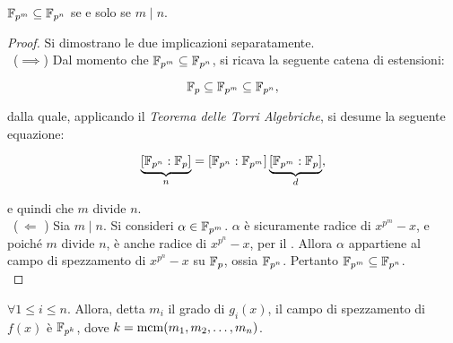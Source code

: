 \begin{theorem}
    \label{th:inclusione}
    $\mathbb{F}_{p^m} \subseteq \mathbb{F}_{p^n}$ se e solo se $m \mid n$.
\end{theorem}

\begin{proof}
    Si dimostrano le due implicazioni separatamente. \\

    \ ($\implies$)\; Dal momento che $\mathbb{F}_{p^m} \subseteq \mathbb{F}_{p^n}$,
        si ricava la seguente catena di estensioni:
        
        \[ \mathbb{F}_p \subseteq \mathbb{F}_{p^m} \subseteq \mathbb{F}_{p^n}, \]
        
        \vskip 0.1in
        
        dalla quale, applicando il \textit{Teorema delle Torri Algebriche},
        si desume la seguente equazione:
        
        \[ \underbrace{[\mathbb{F}_{p^n} : \mathbb{F}_p]}_n = [\mathbb{F}_{p^n} : \mathbb{F}_{p^m}] \underbrace{[\mathbb{F}_{p^m} : \mathbb{F}_p]}_d, \]
        
        e quindi che $m$ divide $n$. \\
        
    \ ($\,\Longleftarrow\,\,$)\; Sia $m \mid n$. Si consideri $\alpha \in \mathbb{F}_{p^m}$. $\alpha$
        è sicuramente radice di $x^{p^m}-x$, e poiché $m$ divide $n$, è
        anche radice di $x^{p^n}-x$, per il . Allora
        $\alpha$ appartiene al campo di spezzamento di $x^{p^n}-x$ su $\mathbb{F}_p$,
        ossia $\mathbb{F}_{p^n}$. Pertanto $\mathbb{F}_{p^m} \subseteq \mathbb{F}_{p^n}$. \\
\end{proof}

\begin{corollary}
    $\forall 1 \leq i \leq n$. Allora, detta $m_i$ il grado di $g_i(x)$, il
    campo di spezzamento di $f(x)$ è $\mathbb{F}_{p^{k}}$, dove $k = \operatorname{mcm}(m_1, m_2, \ldots, m_n)$.
\end{corollary}

